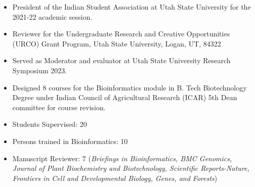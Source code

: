 \begin{itemize}
\item President of the Indian Student Association at Utah State University for the 2021-{}22 academic session.\\[20pt]

\end{itemize}



\begin{itemize}
\item Reviewer for the Undergraduate Research and Creative Opportunities (URCO) Grant Program, Utah State University, Logan, UT, 84322
\item Served as Moderator and evaluator at Utah State University Research Symposium 2023. 
\item Designed 8 courses for the Bioinformatics module in B. Tech Biotechnology Degree under Indian Council of Agricultural Research (ICAR) 5th Dean committee for course revision.
\item Students Supervised: 20
\item Persons trained in Bioinformatics: 10
\item Manuscript Reviewer: 7 (\textit{Briefings in Bioinformatics, BMC Genomics, Journal of Plant Biochemistry and Biotechnology, Scientific Reports-Nature, Frontiers in Cell and Developmental Biology, Genes, and Forests})
\end{itemize}






